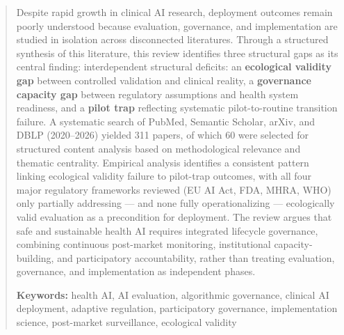 
\begin{abstract}

Despite rapid growth in clinical AI research, deployment outcomes remain
poorly understood because evaluation, governance, and implementation are
studied in isolation across disconnected literatures. Through a structured synthesis of this literature, this review identifies
three structural gaps as its central finding:
interdependent structural deficits: an \textbf{ecological validity gap}
between controlled validation and clinical reality, a \textbf{governance
capacity gap} between regulatory assumptions and health system readiness,
and a \textbf{pilot trap} reflecting systematic pilot-to-routine transition
failure. A systematic search of PubMed, Semantic Scholar, arXiv, and DBLP
(2020--2026) yielded 311 papers, of which 60 were selected for structured
content analysis based on methodological relevance and thematic centrality.
Empirical analysis identifies a consistent pattern linking ecological
validity failure to pilot-trap outcomes, with all four major regulatory
frameworks reviewed (EU AI Act, FDA, MHRA, WHO) only partially
addressing --- and none fully operationalizing --- ecologically valid
evaluation as a precondition for deployment. The review
argues that safe and sustainable health AI requires integrated lifecycle
governance, combining continuous post-market monitoring, institutional
capacity-building, and participatory accountability, rather than treating
evaluation, governance, and implementation as independent phases.

\medskip

\noindent\textbf{Keywords:} health AI, AI evaluation, algorithmic governance,
clinical AI deployment, adaptive regulation, participatory governance,
implementation science, post-market surveillance, ecological validity

\end{abstract}
